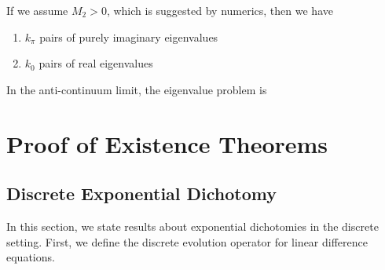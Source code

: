 \documentclass[12pt]{article}
\begin{document}
If we assume $M_2 > 0$, which is suggested by numerics, then we have
\begin{enumerate}
	\item $k_\pi$ pairs of purely imaginary eigenvalues
	\item $k_0$ pairs of real eigenvalues
\end{enumerate}

In the anti-continuum limit, the eigenvalue problem is

\section{Proof of Existence Theorems}

\subsection{Discrete Exponential Dichotomy}

In this section, we state results about exponential dichotomies in the discrete setting. First, we define the discrete evolution operator for linear difference equations.
\end{document}

